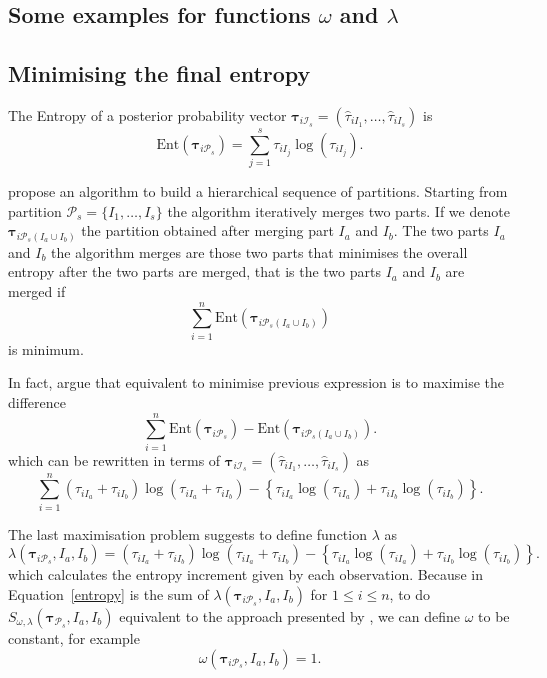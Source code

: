 \documentclass[10pt, a4paper]{article}
\newcommand{\m}[1]{\boldsymbol{#1}}
\begin{document}
\begin{spacing}{1.9}
\section{Some examples for functions $\omega$ and $\lambda$}\label{function_examples}

\subsection{Minimising the final entropy}
\label{entropy_section}

The Entropy of a posterior probability vector $\m\tau_{i \mathcal{I}_s} = \left( \hat{\tau}_{i I_1} , \dots, \hat{\tau}_{i I_s}  \right)$ is
\[
\text{Ent}( \m\tau_{i \mathcal{P}_s} ) = \sum_{j=1}^s \tau_{i I_j}  \log(\tau_{i I_j} ).
\]


\cite{baudry2010combining} propose an algorithm to build a hierarchical sequence of partitions. Starting from partition $\mathcal{P}_s = \{ I_1, \dots, I_s\}$ the algorithm iteratively merges two parts. If we denote $\m\tau_{i \mathcal{P}_s(I_a\cup I_b)}$ the partition obtained after merging part $I_a$ and $I_b$. The two parts $I_a$ and $I_b$ the algorithm merges are those two parts that minimises the overall entropy after the two parts are merged, that is the two parts $I_a$ and $I_b$ are merged if
\[
\sum_{i=1}^n \text{Ent}( \m\tau_{i \mathcal{P}_s(I_a\cup I_b)} )
\]
is minimum.


In fact, \cite{baudry2010combining}  argue that equivalent to minimise previous expression is to maximise the difference
\[
\sum_{i=1}^n \text{Ent}( \m\tau_{i \mathcal{P}_s} ) - \text{Ent}( \m\tau_{i \mathcal{P}_s(I_a\cup I_b)} ).
\]
which can be rewritten in terms of $\m\tau_{i \mathcal{I}_s} = \left( \hat{\tau}_{i I_1} , \dots, \hat{\tau}_{i I_s}  \right)$ as
\begin{equation}\label{entropy}
\sum_{i=1}^n  (\tau_{iI_a}+\tau_{iI_b}) \log(\tau_{iI_a} + \tau_{iI_b}) - \left\{ \tau_{iI_a} \log(\tau_{iI_a}) + \tau_{iI_b} \log(\tau_{iI_b}) \right\}.
\end{equation}


The last maximisation problem suggests to define function $\lambda$ as
\[
\lambda(\m\tau_{i \mathcal{P}_s},  I_a,  I_b) =  (\tau_{iI_a}+\tau_{iI_b}) \log(\tau_{iI_a} + \tau_{iI_b}) - \left\{ \tau_{iI_a} \log(\tau_{iI_a}) + \tau_{iI_b} \log(\tau_{iI_b}) \right\}.
\]
which calculates the entropy increment given by each observation. Because in Equation~\ref{entropy} is the sum of $\lambda(\m\tau_{i \mathcal{P}_s},  I_a,  I_b)$ for $1 \leq i \leq n$, to do $S_{\omega, \lambda}( \m\tau_{\mathcal{P}_s},  I_a,  I_b) $ equivalent to the approach presented by \cite{baudry2010combining}, we can define $\omega$ to be constant, for example 
\[
\omega(\m\tau_{i \mathcal{P}_s},  I_a,  I_b) = 1.
\]


\end{spacing}
\end{document}
